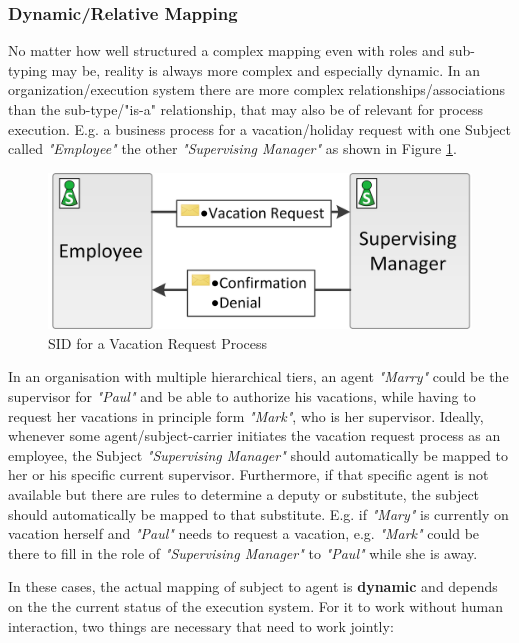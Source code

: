 \subsubsection{Dynamic/Relative Mapping}
\label{sec:dynamicMapping}

No matter how well structured a complex mapping even with roles and sub-typing may be, reality is always more complex and especially dynamic. In an organization/execution system there are more complex relationships/associations than the sub-type/"is-a" relationship, that may also be of relevant for process execution. E.g. a business process for a vacation/holiday request with one Subject called \textit{"Employee"} the other \textit{"Supervising Manager"} as shown in Figure \ref{fig:vacationRequestSID}.

\begin{figure}[htbp]
	\centering
	\includegraphics[width=0.4\linewidth]{Figures/Implementation/VacationRequestSID.png}
	\caption[SID for a Vacation Request Process]{SID for a Vacation Request Process}
	\label{fig:vacationRequestSID}
\end{figure}

 In an organisation with multiple hierarchical tiers, an agent \textit{"Marry"} could be the supervisor for \textit{"Paul"} and be able to authorize his vacations, while having to request her vacations in principle form \textit{"Mark"}, who is her supervisor. Ideally, whenever some agent/subject-carrier initiates the vacation request process as an employee, the Subject \textit{"Supervising Manager"} should automatically be mapped to her or his specific current supervisor. Furthermore, if that specific agent is not available but there are rules to determine a deputy or substitute, the subject should automatically be mapped to that substitute. E.g. if \textit{"Mary"} is currently on vacation herself and \textit{"Paul"} needs to request a vacation, e.g. \textit{"Mark"} could be there to fill in the role of \textit{"Supervising Manager"} to \textit{"Paul"} while she is away. 

In these cases, the actual mapping of subject to agent is \textbf{dynamic} and depends on the the current status of the execution system. For it to work without human interaction, two things are necessary that need to work jointly:

